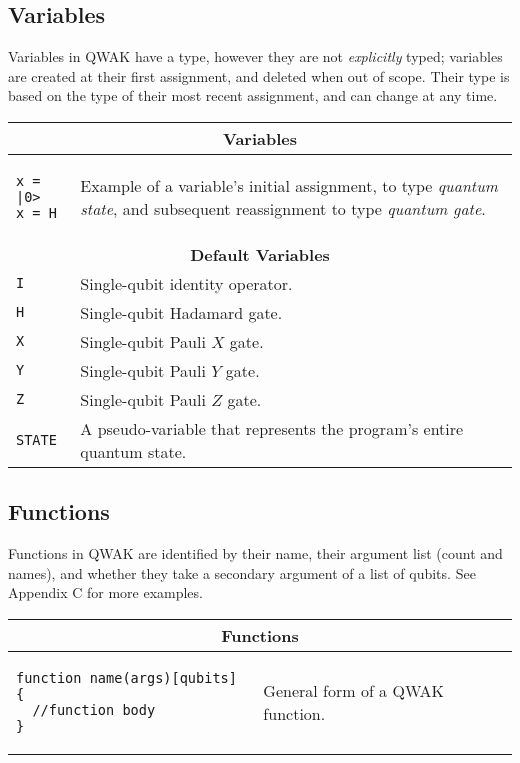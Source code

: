 \documentclass{article}
\begin{document}
\subsection{Variables}

Variables in QWAK have a type, however they are not \textit{explicitly} typed; variables are created at their first assignment, and deleted when out of scope. Their type is based on the type of their most recent assignment, and can change at any time.

\begin{center}
\begin{tabular}{| l | m{7cm} |}
\hline
\multicolumn{2}{|c|}{\textbf{Variables}} \\ \hline
\begin{lstlisting}
x = |0>
x = H
\end{lstlisting} & Example of a variable’s initial assignment, to type \textit{quantum state}, and subsequent reassignment to type \textit{quantum gate}. \\ \hline
\multicolumn{2}{|c|}{\textbf{Default Variables}} \\ \hline
\lstinline$I$ & Single-qubit identity operator. \\ \hline
\lstinline$H$ & Single-qubit Hadamard gate. \\ \hline
\lstinline$X$ & Single-qubit Pauli $X$ gate. \\ \hline
\lstinline$Y$ & Single-qubit Pauli $Y$ gate. \\ \hline
\lstinline$Z$ & Single-qubit Pauli $Z$ gate. \\ \hline
\lstinline$STATE$ & A pseudo-variable that represents the program’s entire quantum state. \\ \hline
\end{tabular}
\end{center}

\pagebreak

\subsection{Functions}

Functions in QWAK are identified by their name, their argument list (count and names), and whether they take a secondary argument of a list of qubits. See Appendix C for more examples.

\begin{center}
\begin{tabular}{| l | l |}
\hline
\multicolumn{2}{|c|}{\textbf{Functions}} \\ \hline
\begin{lstlisting}
function name(args)[qubits] {
  //function body
}
\end{lstlisting} & General form of a QWAK function. \\ \hline
\end{tabular}
\end{center}
\end{document}
